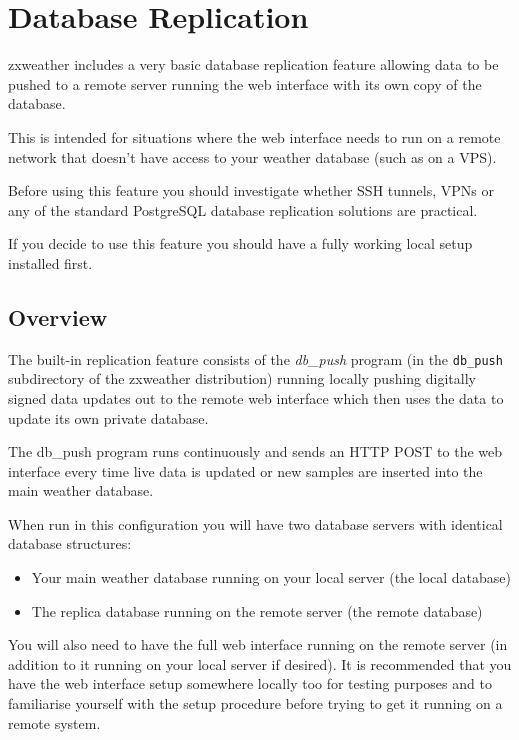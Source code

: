 \documentclass[a4paper,10pt,draft]{book}
\begin{document}
\chapter{Database Replication}
\label{cha_db_replication}

zxweather includes a very basic database replication feature allowing data to be pushed to a remote server running the web interface with its own copy of the database. 

This is intended for situations where the web interface needs to run on a remote network that doesn't have access to your weather database (such as on a VPS).

Before using this feature you should investigate whether SSH tunnels, VPNs or any of the standard PostgreSQL database replication solutions are practical.

If you decide to use this feature you should have a fully working local setup installed first.

\section{Overview}
The built-in replication feature consists of the \emph{db\_push} program (in the \verb|db_push| subdirectory of the zxweather distribution) running locally pushing digitally signed data updates out to the remote web interface which then uses the data to update its own private database.

The db\_push program runs continuously and sends an HTTP POST to the web interface every time live data is updated or new samples are inserted into the main weather database.

When run in this configuration you will have two database servers with identical database structures:
\begin{itemize}
\item Your main weather database running on your local server (the local database)
\item The replica database running on the remote server (the remote database)
\end{itemize}

You will also need to have the full web interface running on the remote server (in addition to it running on your local server if desired). It is recommended that you have the web interface setup somewhere locally too for testing purposes and to familiarise yourself with the setup procedure before trying to get it running on a remote system.
\end{document}
